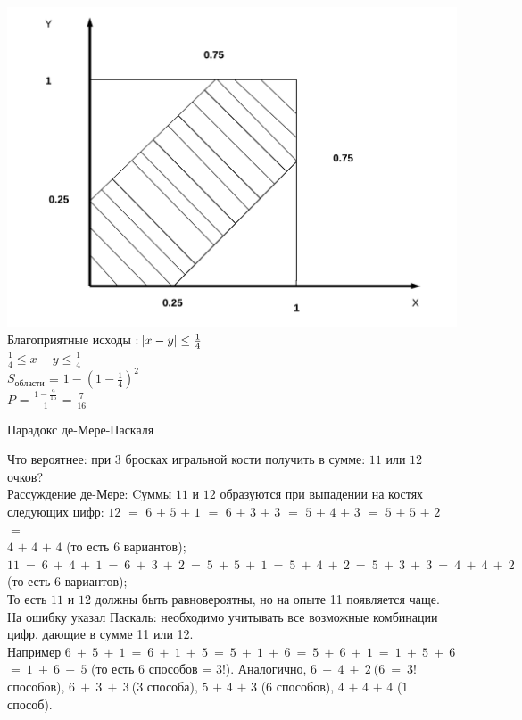 \documentclass[russian, 12pt, fleqn]{article}
\begin{document}
\includegraphics[scale=0.3]{Graphic.png}\\
Благоприятные исходы : $\abs{x - y} \leq \frac{1}{4}$\\
$\frac{1}{4} \leq x - y \leq \frac{1}{4}$\\	
$S_{области}$ = $1 - {(1 - \frac{1}{4})}^2$\\
$P$ = $\frac{1 - \frac{9}{16}}{1}$ = $\frac{7}{16}$
\begin{center}
$\textbf{Парадокс де-Мере-Паскаля }$
\end{center}
Что вероятнее: при $3$ бросках игральной кости получить в сумме: $11$ или $12$ очков?\\
Рассуждение де-Мере: Cуммы $11$ и $12$ образуются при выпадении на костях следующих цифр: $12$ $=$ $6$ $+$  $5$ $+$ $1$ $=$ $6$ $+$ $3$ $+$ $3$ $=$ $5$ $+$ $4$ $+$ $3$ $=$ $5$ $+$ $5$ $+$ $2$ $=$ \\
$4$ $+$ $4$ $+$ $4$ (то есть $6$ вариантов);\\
$11\ =\  6\ +\ 4\ +\ 1\ =\ 6\ +\ 3\ +\ 2\ =\ 5\ +\ 5\ +\ 1\ =\ 5\ +\ 4\ +\ 2\ =\ 5\ +\ 3\ +\ 3\ =\ 4\ +\ 4\ +\ 2\ $(то есть $6$ вариантов);\\
То есть $11$ и $12$ должны быть равновероятны, но на опыте 11 появляется чаще.\\
На ошибку указал Паскаль: необходимо учитывать все возможные комбинации цифр, дающие в сумме 11 или 12.\\
Например $6\ +\ 5\ +\ 1\ =\ 6\ +\ 1\ +\ 5\ =\ 5\ +\ 1\ +\ 6\ =\ 5\ +\  6\ +\ 1\ =\ 1\ +\ 5\ +\ 6$\\
$=\ 1\ +\ 6\ +\ 5$ (то есть $6$ способов = $3$!). Аналогично, $6\ +\ 4\ +\ 2\  $($6\ =\ 3!$ способов), $6\ +\ 3\ +\  3\ $($3$ способа), $5$ $+$ $4$ $+$ $3$ ($6$ способов), $4$ $+$ $4$ $+$ $4$ ($1$ способ).\\
\end{document}
